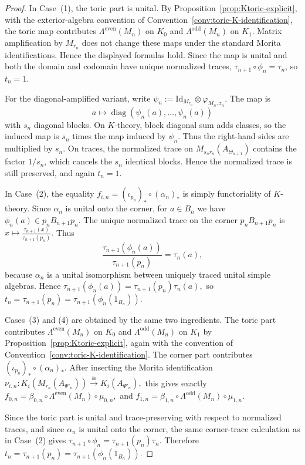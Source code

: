 \documentclass[11pt]{amsart}
\theoremstyle{definition}
\theoremstyle{remark}
\newcommand{\id}{\mathrm{Id}}
\begin{document}
\begin{proof}
In Case~\textup{(1)}, the toric part is unital. By
Proposition~\ref{prop:Ktoric-explicit}, with the exterior-algebra convention of
Convention~\ref{conv:toric-K-identification}, the toric map contributes $\Lambda^{\mathrm{even}}(M_n)$
on $K_0$
and $\Lambda^{\mathrm{odd}}(M_n)$ on $K_1$.
Matrix amplification by \(M_{r_n}\) does not change these maps under the
standard Morita identifications. Hence the displayed formulas hold. Since the
map is unital and both the domain and codomain have unique normalized traces,
$\tau_{n+1}\circ\phi_n=\tau_n$,
so $t_n=1$. 

For the diagonal-amplified variant, write $\psi_n:=\id_{M_{r_n}}\otimes\varphi_{M_n,z_n}.$
The map is
\[
a\longmapsto
\operatorname{diag}(\psi_n(a),\ldots,\psi_n(a))\]
with $s_n$ diagonal blocks. On $K$-theory, block diagonal sum adds classes,
so the induced map is $s_n$ times the map induced by $\psi_n$. Thus the
right-hand sides are multiplied by $s_n$. On traces, the normalized trace on
$M_{s_nr_n}(A_{\Theta_{n+1}})$ contains the factor $1/s_n$, which cancels
the $s_n$ identical blocks. Hence the normalized trace is still preserved, and
again $t_n=1$.


In Case~\textup{(2)}, the equality $f_{i,n}=(\iota_{p_n})_*\circ(\alpha_n)_*$
is simply functoriality of $K$-theory. Since $\alpha_n$ is unital onto the
corner, for $a\in B_n$ we have $\phi_n(a)\in p_nB_{n+1}p_n.$
The unique normalized trace on the corner $p_nB_{n+1}p_n$ is $x\longmapsto \frac{\tau_{n+1}(x)}{\tau_{n+1}(p_n)}.$
Thus
\[
\frac{\tau_{n+1}(\phi_n(a))}{\tau_{n+1}(p_n)}=\tau_n(a),
\]
because $\alpha_n$ is a unital isomorphism between uniquely traced unital
simple algebras. Hence $\tau_{n+1}(\phi_n(a))=\tau_{n+1}(p_n)\tau_n(a),$ so $t_n=\tau_{n+1}(p_n)=\tau_{n+1}(\phi_n(1_{B_n})).$

Cases~\textup{(3)} and \textup{(4)} are obtained by the same two ingredients.
The toric part contributes $\Lambda^{\mathrm{even}}(M_n)$ on $K_0$
and $\Lambda^{\mathrm{odd}}(M_n)$ on $K_1$ by Proposition~\ref{prop:Ktoric-explicit}, again with the convention
of Convention~\ref{conv:toric-K-identification}.  The corner part contributes
$(\iota_{p_n})_*\circ(\alpha_n)_*.$
After inserting the Morita identification $\nu_{i,n}:K_i(M_{r_n}(A_{\Psi'_n}))\xrightarrow{\cong}K_i(A_{\Psi'_n}),$
this gives exactly $f_{0,n}=\beta_{0,n}\circ \Lambda^{\mathrm{even}}(M_n)\circ \mu_{0,n},$
and $f_{1,n}=\beta_{1,n}\circ \Lambda^{\mathrm{odd}}(M_n)\circ \mu_{1,n}.$

Since the toric part is unital and trace-preserving with respect to normalized
traces, and since $\alpha_n$ is unital onto the corner, the same corner-trace
calculation as in Case~\textup{(2)} gives $\tau_{n+1}\circ\phi_n=\tau_{n+1}(p_n)\tau_n.$
Therefore $t_n=\tau_{n+1}(p_n)=\tau_{n+1}(\phi_n(1_{B_n})).$


\end{proof}
\end{document}
